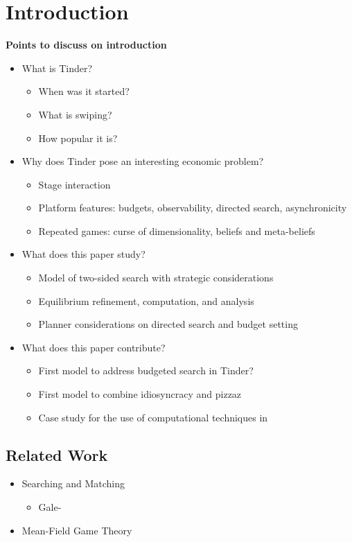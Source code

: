 \section{Introduction}
\label{sec:Introduction} 
\textbf{Points to discuss on introduction}
\begin{itemize}
    \item What is Tinder?
    \begin{itemize}
        \item When was it started?
        \item What is swiping?
        \item How popular it is?
    \end{itemize}
    \item Why does Tinder pose an interesting economic problem?
    \begin{itemize}
        \item Stage interaction
        \item Platform features: budgets, observability, directed search, asynchronicity
        \item Repeated games: curse of dimensionality, beliefs and meta-beliefs
    \end{itemize}
    \item What does this paper study?
    \begin{itemize}
        \item Model of two-sided search with strategic considerations
        \item Equilibrium refinement, computation, and analysis
        \item Planner considerations on directed search and budget setting
    \end{itemize}
    \item What does this paper contribute?
    \begin{itemize}
        \item First model to address budgeted search in Tinder?
        \item First model to combine idiosyncracy and pizzaz
        \item Case study for the use of computational techniques in 
    \end{itemize}
\end{itemize}
\subsection{Related Work}
\begin{itemize}
    \item Searching and Matching
    \begin{itemize}
        \item Gale-
    \end{itemize}
    \item Mean-Field Game Theory
\end{itemize}
